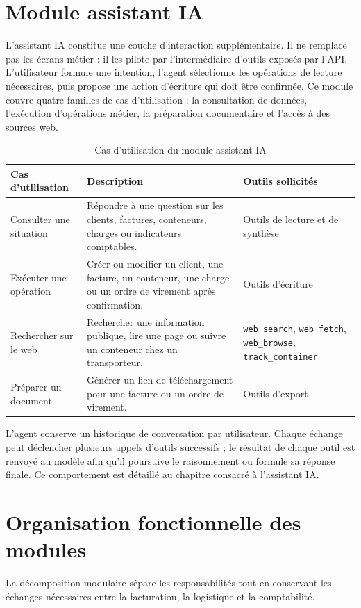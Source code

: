\documentclass[12pt,a4paper,oneside]{report}
\newcommand{\code}[1]{\texttt{#1}}
\begin{document}
\section{Module assistant IA}
L'assistant IA constitue une couche d'interaction supplémentaire. Il ne remplace pas les écrans métier : il les pilote par l'intermédiaire d'outils exposés par l'API. L'utilisateur formule une intention, l'agent sélectionne les opérations de lecture nécessaires, puis propose une action d'écriture qui doit être confirmée. Ce module couvre quatre familles de cas d'utilisation : la consultation de données, l'exécution d'opérations métier, la préparation documentaire et l'accès à des sources web.

\begin{table}[H]\centering
\caption{Cas d'utilisation du module assistant IA}
\begin{tabularx}{\textwidth}{p{3.4cm}Y Y}
\toprule \textbf{Cas d'utilisation} & \textbf{Description} & \textbf{Outils sollicités}\\ \midrule
Consulter une situation & Répondre à une question sur les clients, factures, conteneurs, charges ou indicateurs comptables. & Outils de lecture et de synthèse\\
Exécuter une opération & Créer ou modifier un client, une facture, un conteneur, une charge ou un ordre de virement après confirmation. & Outils d'écriture\\
Rechercher sur le web & Rechercher une information publique, lire une page ou suivre un conteneur chez un transporteur. & \code{web\_search}, \code{web\_fetch}, \code{web\_browse}, \code{track\_container}\\
Préparer un document & Générer un lien de téléchargement pour une facture ou un ordre de virement. & Outils d'export\\
\bottomrule
\end{tabularx}
\end{table}

L'agent conserve un historique de conversation par utilisateur. Chaque échange peut déclencher plusieurs appels d'outils successifs ; le résultat de chaque outil est renvoyé au modèle afin qu'il poursuive le raisonnement ou formule sa réponse finale. Ce comportement est détaillé au chapitre consacré à l'assistant IA.

\section{Organisation fonctionnelle des modules}
La décomposition modulaire sépare les responsabilités tout en conservant les
échanges nécessaires entre la facturation, la logistique et la comptabilité.
\end{document}
